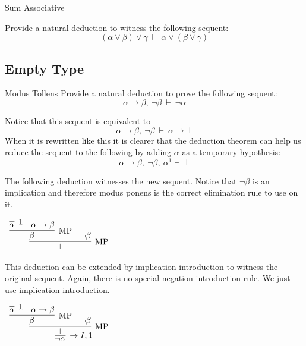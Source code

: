\documentclass{book}
\begin{document}
    \begin{eg}{Sum Associative}

        Provide a natural deduction to witness the following sequent: $$(\alpha \lor \beta) \lor \gamma \ \vdash \ \alpha \lor (\beta \lor \gamma) $$

    \end{eg}
    
    \newpage
    \subsection*{Empty Type}

    \begin{eg}{Modus Tollens}
        Provide a natural deduction to prove the following sequent: $$\alpha \to \beta, \ \lnot \beta \ \vdash \ \lnot \alpha$$

        Notice that this sequent is equivalent to $$\alpha \to \beta, \ \lnot \beta \ \vdash \ \alpha \to \bot$$ When it is rewritten like this it is clearer that the deduction theorem can help us reduce the sequent to the following by adding $\alpha$ as a temporary hypothesis: $$\alpha \to \beta, \ \lnot \beta, \ \alpha^{1} \vdash \ \bot$$

        The following deduction witnesses the new sequent. Notice that $\lnot \beta$ is an implication and therefore modus ponens is the correct elimination rule to use on it. 

        \begin{center}
            $\begin{array}{c}
                \infer[\MP]{\bot}
                        {\infer[\MP]{\beta}
                            {\infer[1]{\alpha}
                                {}
                            &
                            \alpha \to \beta}
                        &
                        \lnot \beta}
            \end{array}$
        \end{center}  

        This deduction can be extended by implication introduction to witness the original sequent. Again, there is no special negation introduction rule. We just use implication introduction.

        \begin{center}
            $\begin{array}{c}
                \infer[\to I,1]{\lnot \alpha}
                    {\infer[\MP]{\bot}
                        {\infer[\MP]{\beta}
                            {\infer[1]{\alpha}
                                {}
                            &
                            \alpha \to \beta}
                        &
                        \lnot \beta}}
            \end{array}$
        \end{center}        
    \end{eg}
\end{document}
